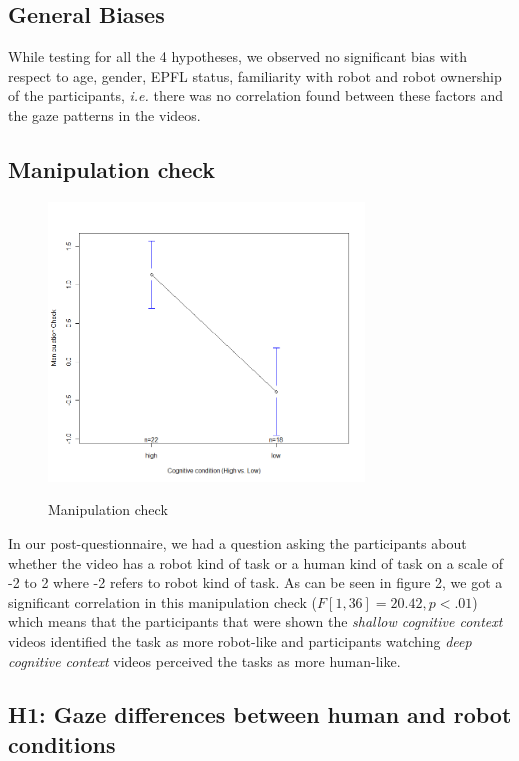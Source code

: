 \documentclass[lettersize, noapacite, twoside, HRI]{apa_HRI}
\newcommand{\ie}{\textit{i.e.}\xspace}
\begin{document}
\subsection{General Biases}

While testing for all the 4 hypotheses, we observed no significant bias with
respect to age, gender, EPFL status, familiarity with robot and robot ownership
of the participants, \ie there was no correlation found between these factors
and the gaze patterns in the videos.

\subsection{Manipulation check}

\begin{figure}
    {\includegraphics[width=3.3in]{ManipulationCheck}}
    \caption{Manipulation check}
    \label{fig:ManipulationCheck}
\end{figure}


In our post-questionnaire, we had a question asking the participants about
whether the video has a robot kind of task or a human kind of task on a scale of
-2 to 2 where -2 refers to robot kind of task. As can be seen in figure 2, we
got a significant correlation in this manipulation check ($F[1,36] = 20.42, p <
.01$) which means that the participants that were shown the \emph{shallow
cognitive context} videos identified the task as more robot-like and
participants watching \emph{deep cognitive context} videos perceived the tasks
as more human-like. 


\subsection{H1: Gaze differences between human and robot conditions}
\end{document}
